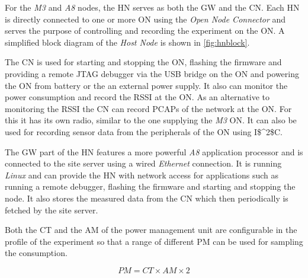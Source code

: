 For the \emph{M3} and \emph{A8} nodes, the \ac{HN} serves as both the \ac{GW}
and the \ac{CN}. Each \ac{HN} is directly connected to one or more \ac{ON} using
the \emph{Open Node Connector} and serves the purpose of controlling and
recording the experiment on the \ac{ON}. A simplified block diagram of the
\emph{Host Node} is shown in \autoref{fig:hnblock}.

The \ac{CN} is used for starting and stopping the \ac{ON}, flashing the firmware
and providing a remote \ac{JTAG} debugger via the \ac{USB} bridge on the \ac{ON}
and powering the \ac{ON} from battery or the an external power supply. It also
can monitor the power consumption and record the \ac{RSSI} at the \ac{ON}. As an
alternative to monitoring the \ac{RSSI} the \ac{CN} can record \acp{PCAP} of the
network at the \ac{ON}. For this it has its own radio, similar to the one
supplying the \emph{M3} \ac{ON}. It can also be used for recording sensor data from the
peripherals of the \ac{ON} using \ac{I$^2$C}.

The \ac{GW} part of the \ac{HN} features a more powerful \emph{A8} application
processor and is connected to the site server using a wired
\emph{Ethernet} connection. It is running \emph{Linux} and can provide the
\ac{HN} with network access for applications such as running a remote debugger,
flashing the firmware and starting and stopping the node. It also stores the
measured data from the \ac{CN} which then periodically is fetched by the
site server.

Both the \ac{CT} and the \ac{AM} of the power management unit are configurable
in the profile of the experiment so that a range of different \ac{PM} can be
used for sampling the consumption.

\begin{equation}
  PM = CT \times AM \times 2
\end{equation}

